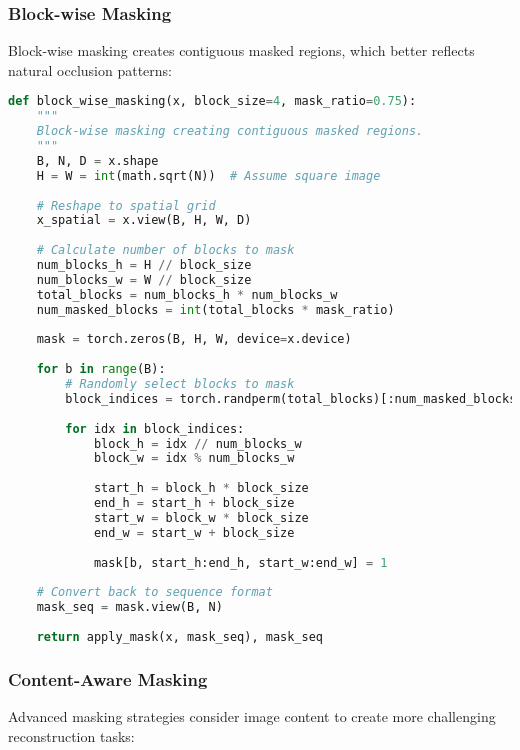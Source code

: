 \subsubsection{Block-wise Masking}

Block-wise masking creates contiguous masked regions, which better reflects natural occlusion patterns:

\begin{lstlisting}[language=Python, caption=Block-wise masking for structured visual learning]
def block_wise_masking(x, block_size=4, mask_ratio=0.75):
    """
    Block-wise masking creating contiguous masked regions.
    """
    B, N, D = x.shape
    H = W = int(math.sqrt(N))  # Assume square image
    
    # Reshape to spatial grid
    x_spatial = x.view(B, H, W, D)
    
    # Calculate number of blocks to mask
    num_blocks_h = H // block_size
    num_blocks_w = W // block_size
    total_blocks = num_blocks_h * num_blocks_w
    num_masked_blocks = int(total_blocks * mask_ratio)
    
    mask = torch.zeros(B, H, W, device=x.device)
    
    for b in range(B):
        # Randomly select blocks to mask
        block_indices = torch.randperm(total_blocks)[:num_masked_blocks]
        
        for idx in block_indices:
            block_h = idx // num_blocks_w
            block_w = idx % num_blocks_w
            
            start_h = block_h * block_size
            end_h = start_h + block_size
            start_w = block_w * block_size
            end_w = start_w + block_size
            
            mask[b, start_h:end_h, start_w:end_w] = 1
    
    # Convert back to sequence format
    mask_seq = mask.view(B, N)
    
    return apply_mask(x, mask_seq), mask_seq
\end{lstlisting}

\subsubsection{Content-Aware Masking}

Advanced masking strategies consider image content to create more challenging reconstruction tasks:

